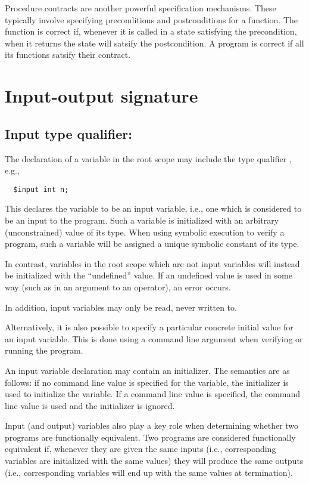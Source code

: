 Procedure contracts are another powerful specification mechanisms.
These typically involve specifying preconditions and postconditions
for a function. The function is correct if, whenever it is called in a
state satisfying the precondition, when it returns the state will
satsify the postcondition. A program is correct if all its functions
satsify their contract.

\section{Input-output signature}

\subsection{Input type qualifier: \cinput}

The declaration of a variable in the root scope may
include the type qualifier \cinput, e.g.,
\begin{verbatim}
  $input int n;
\end{verbatim}
This declares the variable to be an input variable, i.e., one which is
considered to be an input to the program.  Such a variable is
initialized with an arbitrary (unconstrained) value of its type.  When
using symbolic execution to verify a program, such a variable will be
assigned a unique symbolic constant of its type.

In contrast, variables in the root scope which are not input variables
will instead be initialized with the ``undefined'' value.  If an
undefined value is used in some way (such as in an argument to an
operator), an error occurs.

In addition, input variables may only be read, never written to.

Alternatively, it is also possible to specify a particular concrete
initial value for an input variable.  This is done using a command
line argument when verifying or running the program.

An input variable declaration may contain an initializer.  The
semantics are as follows: if no command line value is specified for
the variable, the initializer is used to initialize the variable.  If
a command line value is specified, the command line value is used and
the initializer is ignored.

Input (and output) variables also play a key role when determining
whether two programs are functionally equivalent.  Two programs are
considered functionally equivalent if, whenever they are given the
same inputs (i.e., corresponding \cinput{} variables are initialized
with the same values) they will produce the same outputs (i.e.,
corresponding \coutput{} variables will end up with the same values at
termination).

